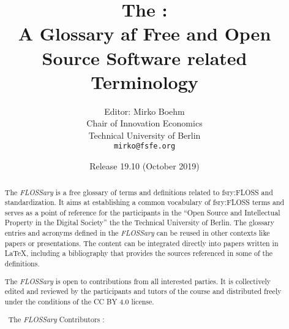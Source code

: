 \documentclass[a4paper]{article}
\title{The \flossary:\\
  A Glossary af Free and Open Source Software related Terminology}
\author{Editor: Mirko Boehm\\
  Chair of Innovation Economics\\
  Technical University of Berlin\\
  \texttt{mirko@fsfe.org}}
\date{Release 19.10 (October 2019)}
\newcommand{\flossary}{{\em FLOSSary} }
\begin{document}
\maketitle \thispagestyle{empty}
\begin{abstract}
  \noindent
  The \flossary is a free glossary of terms and definitions related to
  \gls{fsry:FLOSS} and standardization. It aims at establishing a
  common vocabulary of \gls{fsry:FLOSS} terms and serves as a point of
  reference for the participants in the ``Open Source and Intellectual
  Property in the Digital Society'' the the Technical University of
  Berlin. The glossary entries and acronyms defined in the \flossary
  can be reused in other contexts like papers or presentations. The
  content can be integrated directly into papers written in \LaTeX,
  including a bibliography that provides the sources referenced in
  some of the definitions.

  The \flossary is open to contributions from all interested
  parties. It is collectively edited and reviewed by the participants
  and tutors of the course and distributed freely under the conditions
  of the CC BY 4.0 license.

  \vspace{0.5cm}
  \noindent \textcopyright~The \flossary Contributors \ccby:
  \\ 
\end{abstract}

\clearpage
\glsaddall
{}
\printnoidxglossary[nonumberlist]
\clearpage
\printnoidxglossary[type=\acronymtype,nonumberlist]
\clearpage
\printbibliography
\end{document}

